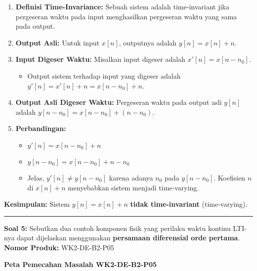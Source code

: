 \documentclass[
  letterpaper,
  DIV=11,
  numbers=noendperiod]{scrreprt}
\providecommand{\tightlist}{%
  \setlength{\itemsep}{0pt}\setlength{\parskip}{0pt}}
\begin{document}
\begin{enumerate}
\def\labelenumi{\arabic{enumi}.}
\tightlist
\item
  \textbf{Definisi Time-Invariance:} Sebuah sistem adalah time-invariant
  jika pergeseran waktu pada input menghasilkan pergeseran waktu yang
  sama pada output.
\item
  \textbf{Output Asli:} Untuk input \(x[n]\), outputnya adalah
  \(y[n] = x[n] + n\).
\item
  \textbf{Input Digeser Waktu:} Misalkan input digeser adalah
  \(x'[n] = x[n-n_0]\).

  \begin{itemize}
  \tightlist
  \item
    Output sistem terhadap input yang digeser adalah
    \(y'[n] = x'[n] + n = x[n-n_0] + n\).
  \end{itemize}
\item
  \textbf{Output Asli Digeser Waktu:} Pergeseran waktu pada output asli
  \(y[n]\) adalah \(y[n-n_0] = x[n-n_0] + (n-n_0)\).
\item
  \textbf{Perbandingan:}

  \begin{itemize}
  \tightlist
  \item
    \(y'[n] = x[n-n_0] + n\)
  \item
    \(y[n-n_0] = x[n-n_0] + n - n_0\)
  \item
    Jelas, \(y'[n] \neq y[n-n_0]\) karena adanya \(n_0\) pada
    \(y[n-n_0]\). Koefisien \(n\) di \(x[n]+n\) menyebabkan sistem
    menjadi time-varying.
  \end{itemize}
\end{enumerate}

\textbf{Kesimpulan:} Sistem \(y[n] = x[n] + n\) \textbf{tidak
time-invariant} (time-varying).

\begin{center}\rule{0.5\linewidth}{0.5pt}\end{center}

\textbf{Soal 5:} Sebutkan dua contoh komponen fisik yang perilaku waktu
kontinu LTI-nya dapat dijelaskan menggunakan \textbf{persamaan
diferensial orde pertama}. \textbf{Nomor Produk:} WK2-DE-B2-P05

\textbf{Peta Pemecahan Masalah WK2-DE-B2-P05}
\end{document}
